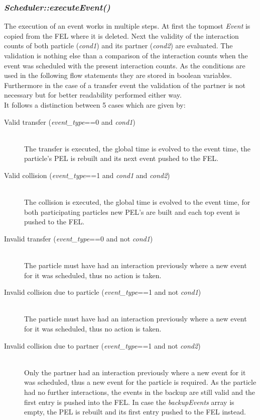 \subsubsection{\quad \textit{Scheduler::executeEvent()}}
The execution of an event works in multiple steps. At first the topmost \textit{Event} is copied from the FEL where it is deleted. Next the validity of the interaction counts of both particle (\textit{cond1}) and its partner (\textit{cond2}) are evaluated. The validation is nothing else than a comparison of the interaction counts when the event was scheduled with the present interaction counts. As the conditions are used in the following flow statements they are stored in boolean variables. Furthermore in the case of a transfer event the validation of the partner is not necessary but for better readability performed either way.\\
It follows a distinction between 5 cases which are given by:
\begin{description}
\item[Valid transfer (\textit{event\_type}==0 and \textit{cond1}) ] \hfill \\ The transfer is executed, the global time is evolved to the event time, the particle's PEL is rebuilt and its next event pushed to the FEL.
\item[Valid collision (\textit{event\_type}==1 and \textit{cond1} and \textit{cond2}) ]\hfill \\ The collision is executed, the global time is evolved to the event time, for both participating particles new PEL's are built and each top event is pushed to the FEL.
\item[Invalid transfer (\textit{event\_type}==0 and not \textit{cond1})] \hfill \\ The particle must have had an interaction previously where a new event for it was scheduled, thus no action is taken.
\item[Invalid collision due to particle (\textit{event\_type}==1 and not \textit{cond1})] \hfill \\  The particle must have had an interaction previously where a new event for it was scheduled, thus no action is taken.
\item[Invalid collision due to partner (\textit{event\_type}==1 and not \textit{cond2})] \hfill \\  Only the partner had an interaction previously where a new event for it was scheduled, thus a new event for the particle is required. As the particle had no further interactions, the events in the backup are still valid and the first entry is pushed into the FEL. In case the \textit{backupEvents} array is empty, the PEL is rebuilt and its first entry pushed to the FEL instead.
\end{description}

